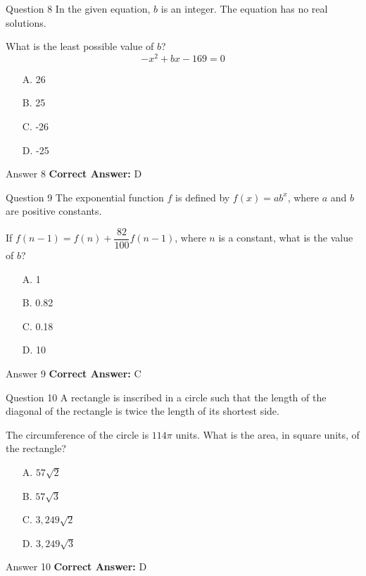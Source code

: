 \documentclass{beamer}
\begin{document}
\begin{frame}{Question 8}
\small
In the given equation, \(b\) is an integer. The equation has no real solutions.

What is the least possible value of \(b\)?
\[
-x^2 + bx - 169 = 0
\]
\vspace{0.35cm}
\begin{enumerate}
    \item[A.] 26
    \item[B.] 25
    \item[C.] -26
    \item[D.] -25
\end{enumerate}
\end{frame}
\begin{frame}{Answer 8}
\small
\textbf{Correct Answer:} D
\end{frame}

\begin{frame}{Question 9}
\small
The exponential function \(f\) is defined by \(f(x) = ab^x\), where \(a\) and \(b\) are positive constants.

If \(f(n - 1) = f(n) + \dfrac{82}{100}f(n - 1)\), where \(n\) is a constant, what is the value of \(b\)?
\vspace{0.35cm}
\begin{enumerate}
    \item[A.] 1
    \item[B.] 0.82
    \item[C.] 0.18
    \item[D.] 10
\end{enumerate}
\end{frame}
\begin{frame}{Answer 9}
\small
\textbf{Correct Answer:} C
\end{frame}

\begin{frame}{Question 10}
\small
A rectangle is inscribed in a circle such that the length of the diagonal of the rectangle is twice the length of its shortest side.

The circumference of the circle is \(114\pi\) units. What is the area, in square units, of the rectangle?
\vspace{0.35cm}
\begin{enumerate}
    \item[A.] \(57\sqrt{2}\)
    \item[B.] \(57\sqrt{3}\)
    \item[C.] \(3,\!249\sqrt{2}\)
    \item[D.] \(3,\!249\sqrt{3}\)
\end{enumerate}
\end{frame}
\begin{frame}{Answer 10}
\small
\textbf{Correct Answer:} D
\end{frame}
\end{document}

